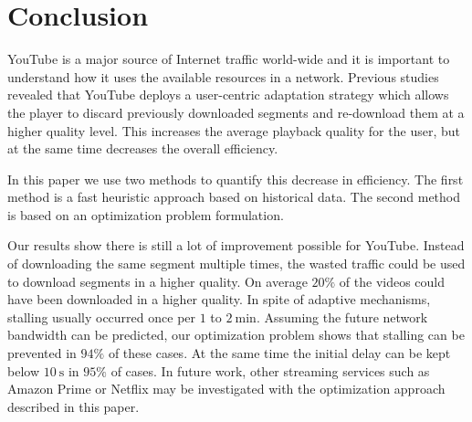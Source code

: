 
\section{Conclusion}
\label{sec:conclusion}

YouTube is a major source of Internet traffic world-wide and it is important to understand how it uses the available resources in a network.
Previous studies revealed that YouTube deploys a user-centric adaptation strategy which allows the player to discard previously downloaded segments and re-download them at a higher quality level.
This increases the average playback quality for the user, but at the same time decreases the overall efficiency.

In this paper we use two methods to quantify this decrease in efficiency.
The first method is a fast heuristic approach based on historical data.
The second method is based on an optimization problem formulation.

Our results show there is still a lot of improvement possible for YouTube. Instead of downloading the same segment multiple times, the wasted traffic could be used to download segments in a higher quality. On average $20\%$ of the videos could have been downloaded in a higher quality. In spite of adaptive mechanisms, stalling usually occurred once per $1$ to $\SI{2}{\minute}$. Assuming the future network bandwidth can be predicted, our optimization problem shows that stalling can be prevented in $94\%$ of these cases. At the same time the initial delay can be kept below $\SI{10}{\second}$ in $95\%$ of cases. In future work, other streaming services such as Amazon Prime or Netflix may be investigated with the optimization approach described in this paper.
